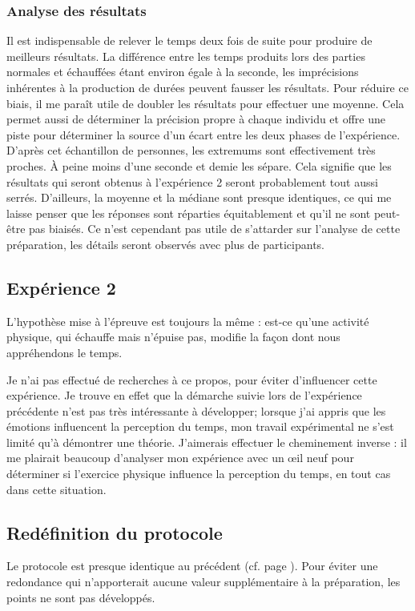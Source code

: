 \documentclass[12pt,fleqn,oneside,french,openany]{book} %
\begin{document}
\subsubsection{Analyse des résultats} \label{sssec:analyseResult2.1}
Il est indispensable de relever le temps deux fois de suite pour produire de meilleurs résultats. La différence entre les temps produits lors des parties normales et échauffées étant environ égale à la seconde, les imprécisions inhérentes à la production de durées peuvent fausser les résultats. Pour réduire ce biais, il me paraît utile de doubler les résultats pour effectuer une moyenne. Cela permet aussi de déterminer la précision propre à chaque individu et offre une piste pour déterminer la source d'un écart entre les deux phases de l'expérience. D'après cet échantillon de personnes, les extremums sont effectivement très proches. À peine moins d'une seconde et demie les sépare. Cela signifie que les résultats qui seront obtenus à l'expérience 2 seront probablement tout aussi serrés. D'ailleurs, la moyenne et la médiane sont presque identiques, ce qui me laisse penser que les réponses sont réparties équitablement et qu'il ne sont peut-être pas biaisés. Ce n'est cependant pas utile de s'attarder sur l'analyse de cette préparation, les détails seront observés avec plus de participants.


\subsection{Expérience 2} \label{ssec:but2.2}
L'hypothèse mise à l'épreuve est toujours la même : est-ce qu'une activité physique, qui échauffe mais n'épuise pas, modifie la façon dont nous appréhendons le temps. 

Je n'ai pas effectué de recherches à ce propos, pour éviter d'influencer cette expérience. Je trouve en effet que la démarche suivie lors de l'expérience précédente n'est pas très intéressante à développer; lorsque j'ai appris que les émotions influencent la perception du temps, mon travail expérimental ne s'est limité qu'à démontrer une théorie. J'aimerais effectuer le cheminement inverse : il me plairait beaucoup d'analyser mon expérience avec un \oe il neuf pour déterminer si l'exercice physique influence la perception du temps, en tout cas dans cette situation.

\subsection{Redéfinition du protocole} \label{ssec:defProto2.2}
\begin{remark}
	Le protocole est presque identique au précédent (cf. page \pageref{sssec:preparation2.1}). Pour éviter une redondance qui n'apporterait aucune valeur supplémentaire à la préparation, les points ne sont pas développés.
\end{remark}
\end{document}

